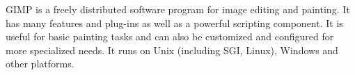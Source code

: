 GIMP is a freely distributed software program for image editing and painting.
It has many features and plug-ins as well as a powerful scripting component.
It is useful for basic painting tasks and can also be customized and configured
for more specialized needs. It runs on Unix (including SGI, Linux), Windows and
other platforms.
